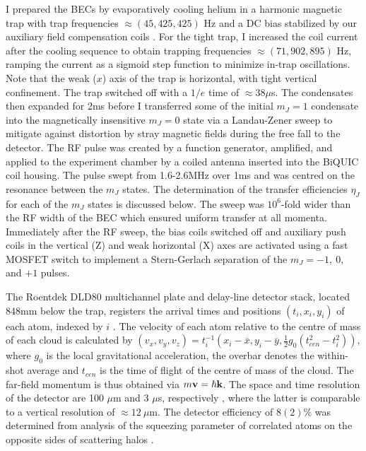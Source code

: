 	I prepared the BECs by evaporatively cooling helium in a harmonic magnetic trap with trap frequencies $\approx(45,425,425)$ Hz and a DC bias stabilized by our auxiliary field compensation coils \cite{Dall07,Dedman07}. For the tight trap, I increased the coil current after the cooling sequence to obtain trapping frequencies $\approx(71,902,895)$ Hz, ramping the current as a sigmoid step function to minimize in-trap oscillations. Note that the weak ($x$) axis of the trap is horizontal, with tight vertical confinement. The trap switched off with a $1/e$ time of $\approx38\mu$s. The condensates then expanded for 2ms before I transferred some of the initial $m_J=1$ condensate into the magnetically insensitive $m_J=0$ state via a Landau-Zener sweep to mitigate against distortion by stray magnetic fields during the free fall to the detector. The RF pulse was created by a function generator, amplified, and applied to the experiment chamber by a coiled antenna inserted into the BiQUIC coil housing. The pulse swept from 1.6-2.6MHz over 1ms and was centred on the resonance between the $m_J$ states. The determination of the transfer efficiencies $\eta_J$ for each of the $m_J$ states is discussed below. The sweep was $10^6$-fold wider than the RF width of the BEC which ensured uniform transfer at all momenta. Immediately after the RF sweep, the bias coils switched off and auxiliary push coils in the vertical (Z) and weak horizontal (X) axes are activated using a fast MOSFET switch to implement a Stern-Gerlach separation of the $m_J = -1,~0,$ and $+1$ pulses.

	The Roentdek DLD80 multichannel plate and delay-line detector stack, located 848mm below the trap, registers the arrival times and positions $(t_i,x_i,y_i)$ of each atom, indexed by $i$ \cite{Manning10}. 
	The velocity of each atom relative to the centre of mass of each cloud is calculated by $(v_x,v_y,v_z) = t_{i}^{-1}(x_i-\bar{x},y_i-\bar{y},\tfrac{1}{2}g_0(t_{cen}^2-t_{i}^{2}))$, where $g_0$ is the local gravitational acceleration, the overbar denotes the within-shot average and $t_{cen}$ is the time of flight of the centre of mass of the cloud. 
	The far-field momentum is thus obtained via $m\textbf{v} = \hbar\textbf{k}$.
	The space and time resolution of the detector are 100 $\mu$m and 3 $\mu$s, respectively \cite{Henson18_BCR}, where the latter is comparable to a vertical resolution of $\approx 12~\mu$m.
	The detector efficiency of $8(2)\%$ was determined from analysis of the squeezing parameter of correlated atoms on the opposite sides of scattering halos \cite{Shin19,Shin20,Jaskula10}. 

